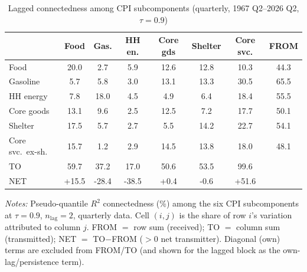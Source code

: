 \begin{table}[!ht]
\centering
\caption{Lagged connectedness among CPI subcomponents (quarterly, 1967 Q2--2026 Q2, $\tau=0.9$)}
\label{tab:connlfullq}
\setlength{\tabcolsep}{4pt}\footnotesize
\begin{threeparttable}
\begin{tabular}{l c c c c c c c}
\toprule
 & Food & Gas. & HH en. & Core gds & Shelter & Core svc. & FROM \\
\midrule
Food & 20.0 & 2.7 & 5.9 & 12.6 & 12.8 & 10.3 & 44.3 \\
Gasoline & 5.7 & 5.8 & 3.0 & 13.1 & 13.3 & 30.5 & 65.5 \\
HH energy & 7.8 & 18.0 & 4.5 & 4.9 & 6.4 & 18.4 & 55.5 \\
Core goods & 13.1 & 9.6 & 2.5 & 12.5 & 7.2 & 17.7 & 50.1 \\
Shelter & 17.5 & 5.7 & 2.7 & 5.5 & 14.2 & 22.7 & 54.1 \\
Core svc.\ ex-sh. & 15.7 & 1.2 & 2.9 & 14.5 & 13.8 & 18.0 & 48.1 \\
\midrule
TO & 59.7 & 37.2 & 17.0 & 50.6 & 53.5 & 99.6 &  \\
NET & +15.5 & -28.4 & -38.5 & +0.4 & -0.6 & +51.6 &  \\
\bottomrule
\end{tabular}
\begin{tablenotes}[flushleft]\footnotesize
\item \textit{Notes:} Pseudo-quantile $R^2$ connectedness (\%) among the six CPI subcomponents at $\tau=0.9$, $n_{\text{lag}}=2$, quarterly data. Cell $(i,j)$ is the share of row $i$'s variation attributed to column $j$. FROM $=$ row sum (received); TO $=$ column sum (transmitted); NET $=$ TO$-$FROM ($>0$ net transmitter). Diagonal (own) terms are excluded from FROM/TO (and shown for the lagged block as the own-lag/persistence term).
\end{tablenotes}
\end{threeparttable}
\end{table}

